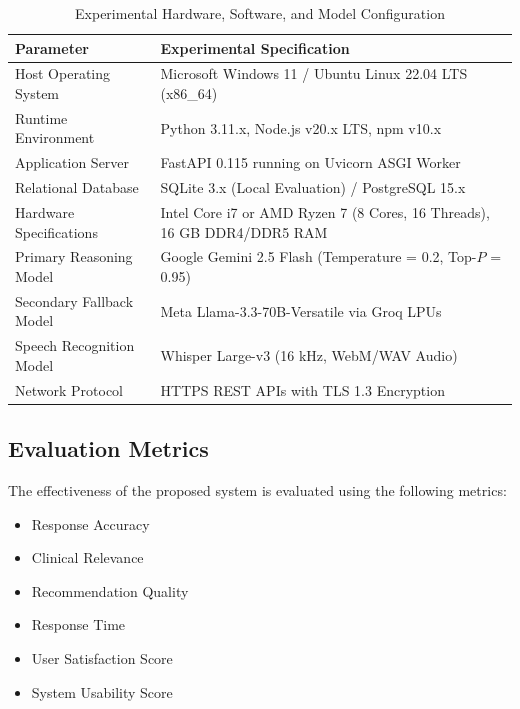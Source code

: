 \documentclass[conference]{IEEEtran}
\begin{document}
\begin{table}[t]
\centering
\caption{Experimental Hardware, Software, and Model Configuration}
\label{tab:experiment}
\renewcommand{\arraystretch}{1.15}
\footnotesize
\begin{tabularx}{\textwidth}{|>{\raggedright\arraybackslash}p{}|L|}
\hline
\textbf{Parameter} & \textbf{Experimental Specification} \\
\hline
Host Operating System &
Microsoft Windows 11 / Ubuntu Linux 22.04 LTS (x86\_64) \\
\hline
Runtime Environment &
Python 3.11.x, Node.js v20.x LTS, npm v10.x \\
\hline
Application Server &
FastAPI 0.115 running on Uvicorn ASGI Worker \\
\hline
Relational Database &
SQLite 3.x (Local Evaluation) / PostgreSQL 15.x \\
\hline
Hardware Specifications &
Intel Core i7 or AMD Ryzen 7 (8 Cores, 16 Threads), 16 GB DDR4/DDR5 RAM \\
\hline
Primary Reasoning Model &
Google Gemini 2.5 Flash (Temperature = 0.2, Top-$P$ = 0.95) \\
\hline
Secondary Fallback Model &
Meta Llama-3.3-70B-Versatile via Groq LPUs \\
\hline
Speech Recognition Model &
Whisper Large-v3 (16 kHz, WebM/WAV Audio) \\
\hline
Network Protocol &
HTTPS REST APIs with TLS 1.3 Encryption \\
\hline
\end{tabularx}
\end{table}
\subsection{Evaluation Metrics}

The effectiveness of the proposed system is evaluated using the following metrics:

\begin{itemize}
    \item Response Accuracy
    \item Clinical Relevance
    \item Recommendation Quality
    \item Response Time
    \item User Satisfaction Score
    \item System Usability Score
\end{itemize}


\end{document}
